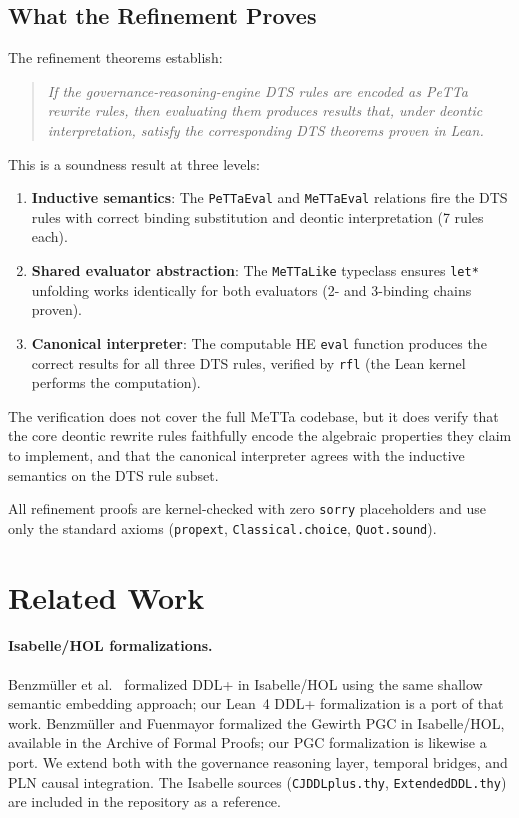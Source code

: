 \documentclass[]{article}
\newcommand{\code}[1]{\texttt{#1}}
\newcommand{\DDL}{\textup{DDL+}}
\newcommand{\DTS}{\textup{DTS}}
\newcommand{\PLN}{\textup{PLN}}
\newcommand{\PGC}{\textup{PGC}}
\begin{document}
\subsection{What the Refinement Proves}

The refinement theorems establish:

\begin{quote}
\emph{If the governance-reasoning-engine DTS rules are encoded as PeTTa rewrite
rules, then evaluating them produces results that, under deontic interpretation,
satisfy the corresponding \DTS{} theorems proven in Lean.}
\end{quote}

\noindent
This is a soundness result at three levels:

\begin{enumerate}
\item \textbf{Inductive semantics}: The \code{PeTTaEval} and
      \code{MeTTaEval} relations fire the DTS rules with correct
      binding substitution and deontic interpretation (7 rules each).
\item \textbf{Shared evaluator abstraction}: The \code{MeTTaLike}
      typeclass ensures \code{let*} unfolding works identically for
      both evaluators (2- and 3-binding chains proven).
\item \textbf{Canonical interpreter}: The computable HE \code{eval}
      function produces the correct results for all three DTS rules,
      verified by \code{rfl} (the Lean kernel performs the computation).
\end{enumerate}

\noindent
The verification does not cover the full MeTTa codebase, but it does
verify that the core deontic rewrite rules faithfully encode the
algebraic properties they claim to implement, and that the canonical
interpreter agrees with the inductive semantics on the DTS rule subset.

All refinement proofs are kernel-checked with zero \code{sorry} placeholders
and use only the standard axioms (\code{propext}, \code{Classical.choice},
\code{Quot.sound}).

\section{Related Work}
\label{sec:related}

\paragraph{Isabelle/HOL formalizations.}
Benzm{\"u}ller et al.\ \cite{Benzmuller2018} formalized \DDL{} in Isabelle/HOL
using the same shallow semantic embedding approach; our Lean~4 \DDL{} formalization
is a port of that work.
Benzm{\"u}ller and Fuenmayor \cite{Benzmuller2019PGC} formalized the Gewirth \PGC{}
in Isabelle/HOL, available in the Archive of Formal Proofs; our \PGC{}
formalization is likewise a port.
We extend both with the governance reasoning layer, temporal bridges,
and \PLN{} causal integration.
The Isabelle sources (\code{CJDDLplus.thy}, \code{ExtendedDDL.thy}) are
included in the repository as a reference.
\end{document}
